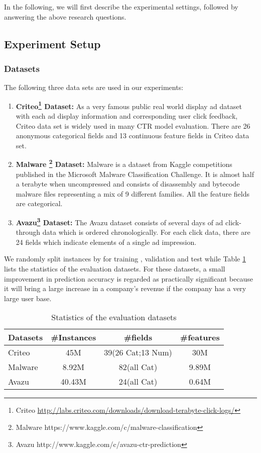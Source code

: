 \documentclass[sigconf]{acmart}
\begin{document}
In the following, we will first describe the experimental settings, followed by answering the above research questions.

\subsection{Experiment Setup}
\subsubsection{Datasets}
The following three data sets are used in our experiments:

\begin{enumerate}
  \item \textbf{Criteo\footnote{Criteo \url{http://labs.criteo.com/downloads/download-terabyte-click-logs/}} Dataset:}
  As a very famous public real world display ad dataset with each ad display information and corresponding user click feedback, Criteo data set is widely used in many CTR model evaluation. There are 26 anonymous categorical fields and 13 continuous feature fields in Criteo data set.

  \item \textbf{Malware \footnote{Malware https://www.kaggle.com/c/malware-classification} Dataset:}
    Malware is a dataset from Kaggle competitions published in the Microsoft Malware Classification Challenge. It is almost half a terabyte when uncompressed and consists of disassembly and bytecode malware files representing a mix of 9 different families. All the  feature  fields are categorical.

  \item \textbf{Avazu\footnote{Avazu http://www.kaggle.com/c/avazu-ctr-prediction} Dataset:}
    The Avazu dataset consists of several days of ad click- through data which is ordered chronologically. For each click data, there are 24 fields which indicate elements of a single ad impression.
\end{enumerate}



We randomly split instances by  for training , validation and test while Table \ref{tab:datasets} lists the statistics of the evaluation datasets. For these datasets, a small improvement in prediction accuracy is regarded as practically significant because it will bring a large increase in a company's revenue if the company has a very large user base.

\begin{table}
\centering
\caption{Statistics of the evaluation datasets}
\begin{tabular}{l|ccc}
\toprule
Datasets  & \#Instances & \#fields & \#features \\
\midrule
Criteo       & 45M  & 39(26 Cat;13 Num) & 30M     \\
Malware     & 8.92M  & 82(all Cat) & 9.89M \\
Avazu       & 40.43M  & 24(all Cat) & 0.64M     \\
\bottomrule
\end{tabular}
\label{tab:datasets}
\end{table}
\end{document}
